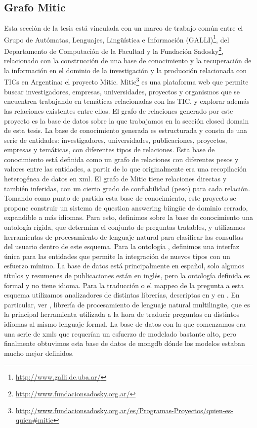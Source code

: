 \subsection{Grafo Mitic}
\label{subsec:mitic}
\horrible
Esta sección de la tesis está vinculada con un marco de trabajo común entre el
Grupo de Autómatas, Lenguajes, Lingüística e Información (GALLI)\footnote{\url{http://www.galli.dc.uba.ar/}}, 
del Departamento de Computación de la Facultad y la Fundación Sadosky\footnote{\url{http://www.fundacionsadosky.org.ar/}}, relacionado con la construcción de una base de conocimiento
 y la recuperación de la información en el dominio de la investigación y la
producción relacionada con TICs en Argentina: el proyecto Mitic.
Mitic\footnote{\url{http://www.fundacionsadosky.org.ar/es/Programas-Proyectos/quien-es-quien\#mitic}} es una plataforma web que permite buscar investigadores, empresas, universidades, proyectos y organismos que se encuentren trabajando en temáticas relacionadas con las TIC, y explorar además las relaciones existentes entre ellos. El grafo de relaciones generado por este proyecto es la base de datos sobre la que trabajamos en la sección closed domain de esta tesis.
La base de conocimiento generada es estructurada y consta de
una serie de entidades: investigadores, universidades, publicaciones,
proyectos, empresas y temáticas, con diferentes tipos de relaciones.
Esta base de conocimiento está definida como un grafo de relaciones con diferentes pesos y valores entre
las entidades, a partir de lo que originalmente era una
recopilación heterogénea de datos en xml. El grafo de Mitic
tiene relaciones directas y también inferidas, con un cierto grado
de confiabilidad (peso) para cada relación. Tomando como punto de
partida esta base de conocimiento, este proyecto se propone construir
un sistema de question answering biingüe de dominio cerrado, expandible a más idiomas.
Para esto, definimos sobre la base de conocimiento una ontología
rígida, que determina el conjunto de preguntas tratables, y
utilizamos herramientas de procesamiento de lenguaje natural para
clasificar las consultas del usuario dentro de este esquema. Para la
ontología , definimos una interfaz única para las entidades que
permite la integración de nuevos tipos con un esfuerzo mínimo. 
La base de datos está principalmente en español, solo algunos títulos y resumenes de publicaciones están en inglés,
pero la ontología definida es formal y no tiene idioma. 
Para la traducción o el mappeo de la pregunta a esta esquema utilizamos 
analizadores de distintas librerías, descriptas en  y en .
En particular, ver , librería de procesamiento de lenguaje natural multilingüe, que
es la principal herramienta utilizada a la hora de traducir preguntas en distintos idiomas al mismo lenguaje formal.
La base de datos con la que comenzamos era una serie de xmls que requerían un esfuerzo de modelado bastante alto,
pero finalmente obtuvimos esta base de datos de mongdb dónde los modelos estaban mucho mejor definidos.

